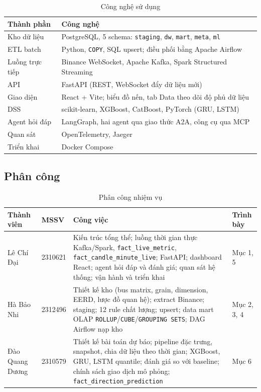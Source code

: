 \documentclass[11pt,a4paper]{article}
\newcommand{\code}[1]{\texttt{#1}}
\begin{document}
\begin{table}[H]
\centering\small
\begin{tabularx}{\linewidth}{lX}
\toprule
\textbf{Thành phần} & \textbf{Công nghệ} \\
\midrule
Kho dữ liệu & PostgreSQL, 5 schema: \code{staging}, \code{dw}, \code{mart}, \code{meta}, \code{ml} \\
ETL batch & Python, \code{COPY}, SQL upsert; điều phối bằng Apache Airflow \\
Luồng trực tiếp & Binance WebSocket, Apache Kafka, Spark Structured Streaming \\
API & FastAPI (REST, WebSocket đẩy dữ liệu mới) \\
Giao diện & React + Vite; biểu đồ nến, tab Data theo dõi độ phủ dữ liệu \\
DSS & scikit-learn, XGBoost, CatBoost, PyTorch (GRU, LSTM) \\
Agent hỏi đáp & LangGraph, hai agent qua giao thức A2A, công cụ qua MCP \\
Quan sát & OpenTelemetry, Jaeger \\
Triển khai & Docker Compose \\
\bottomrule
\end{tabularx}
\caption{Công nghệ sử dụng}
\end{table}

\subsection{Phân công}
\begin{table}[H]
\centering\small
\begin{tabularx}{\linewidth}{llXl}
\toprule
\textbf{Thành viên} & \textbf{MSSV} & \textbf{Công việc} & \textbf{Trình bày} \\
\midrule
Lê Chí Đại & 2310621 & Kiến trúc tổng thể; luồng thời gian thực Kafka/Spark, \code{fact\_live\_metric}, \code{fact\_candle\_minute\_live}; FastAPI; dashboard React; agent hỏi đáp và đánh giá; quan sát hệ thống; vận hành và triển khai & Mục 1, 5 \\
Hà Bảo Nhi & 2312496 & Thiết kế kho (bus matrix, grain, dimension, EERD, lược đồ quan hệ); extract Binance; staging; 12 rule chất lượng; upsert; data mart OLAP \code{ROLLUP}/\code{CUBE}/\code{GROUPING SETS}; DAG Airflow nạp kho & Mục 2, 3, 4 \\
Đào Quang Dương & 2310579 & Thiết kế bài toán dự báo; pipeline đặc trưng, snapshot, chia dữ liệu theo thời gian; XGBoost, GRU, LSTM quantile; đánh giá so với baseline; chính sách giao dịch mô phỏng; \code{fact\_direction\_prediction} & Mục 6 \\
\bottomrule
\end{tabularx}
\caption{Phân công nhiệm vụ}
\end{table}
\end{document}
